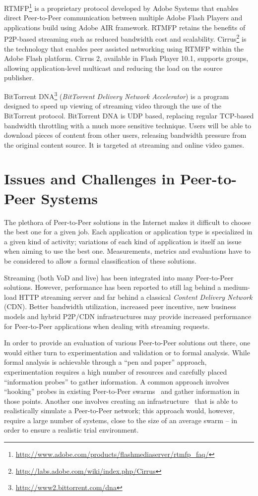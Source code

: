 RTMFP\footnote{\url{http://www.adobe.com/products/flashmediaserver/rtmfp_faq/}} is a
proprietary protocol developed by Adobe Systems that enables direct
Peer-to-Peer communication between multiple Adobe Flash Players and
applications build using Adobe AIR framework. RTMFP retains the benefits of
P2P-based streaming such as reduced bandwidth cost and scalability.
Cirrus\footnote{\url{http://labs.adobe.com/wiki/index.php/Cirrus}} is the technology
that enables peer assisted networking using RTMFP within the Adobe Flash
platform. Cirrus 2, available in Flash Player 10.1, supports groups, allowing
application-level multicast and reducing the load on the source publisher.

BitTorrent DNA\footnote{\url{http://www2.bittorrent.com/dna}} (\textit{BitTorrent
Delivery Network Accelerator}) is a program designed to speed up viewing of
streaming video through the use of the BitTorrent protocol. BitTorrent DNA is
UDP based, replacing regular TCP-based bandwidth throttling with a much more
sensitive technique. Users will be able to download pieces of content from
other users, releasing bandwidth pressure from the original content source. It
is targeted at streaming and online video games.

\section{Issues and Challenges in Peer-to-Peer Systems}
\label{sec:p2p-systems:issues}

The plethora of Peer-to-Peer solutions in the Internet makes it difficult to
choose the best one for a given job. Each application or application type is
specialized in a given kind of activity; variations of each kind of
application is itself an issue when aiming to use the best one. Measurements,
metrics and evaluations have to be considered to allow a formal classification
of these solutions.

Streaming (both VoD and live) has been integrated into many Peer-to-Peer
solutions.  However, performance has been reported to still lag behind a
medium-load HTTP streaming server and far behind a classical \textit{Content
Delivery Network} (CDN). Better bandwidth utilization, increased peer
incentive, new business models and hybrid P2P/CDN infrastructures may provide
increased performance for Peer-to-Peer applications when dealing with
streaming requests.

In order to provide an evaluation of various Peer-to-Peer solutions out there,
one would either turn to experimentation and validation or to formal
analysis. While formal analysis is achievable through a ``pen and paper''
approach, experimentation requires a high number of resources and carefully
placed ``information probes'' to gather information. A common approach
involves ``hooking'' probes in existing Peer-to-Peer
swarms~\cite{corr-overlay} and gather
information in those points. Another one involves creating an
infrastructure~\cite{bt-vi}
that is able to realistically simulate a Peer-to-Peer network; this approach
would, however, require a large number of systems, close to the size of an
average swarm -- in order to ensure a realistic trial environment.

